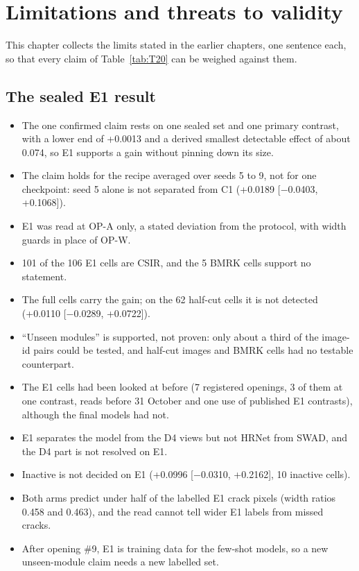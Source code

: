 \chapter{Limitations and threats to validity}\label{ch:limitations}

This chapter collects the limits stated in the earlier chapters, one sentence each, so that every claim of Table~\ref{tab:T20} can
be weighed against them.

\section{The sealed E1 result}\label{sec:lim-e1}

\begin{itemize}
  \item The one confirmed claim rests on one sealed set and one primary contrast, with a lower end of +0.0013 and a derived smallest
  detectable effect of about 0.074, so E1 supports a gain without pinning down its size.
  \item The claim holds for the recipe averaged over seeds 5 to 9, not for one checkpoint: seed 5 alone is not separated from C1
  (+0.0189 [$-$0.0403, +0.1068]).
  \item E1 was read at OP-A only, a stated deviation from the protocol, with width guards in place of OP-W.
  \item 101 of the 106 E1 cells are CSIR, and the 5 BMRK cells support no statement.
  \item The full cells carry the gain; on the 62 half-cut cells it is not detected (+0.0110 [$-$0.0289, +0.0722]).
  \item ``Unseen modules'' is supported, not proven: only about a third of the image-id pairs could be tested, and half-cut images
  and BMRK cells had no testable counterpart.
  \item The E1 cells had been looked at before (7 registered openings, 3 of them at one contrast, reads before 31 October and one
  use of published E1 contrasts), although the final models had not.
  \item E1 separates the model from the D4 views but not HRNet from SWAD, and the D4 part is not resolved on E1.
  \item Inactive is not decided on E1 (+0.0996 [$-$0.0310, +0.2162], 10 inactive cells).
  \item Both arms predict under half of the labelled E1 crack pixels (width ratios 0.458 and 0.463), and the read cannot tell wider
  E1 labels from missed cracks.
  \item After opening \#9, E1 is training data for the few-shot models, so a new unseen-module claim needs a new labelled set.
\end{itemize}

